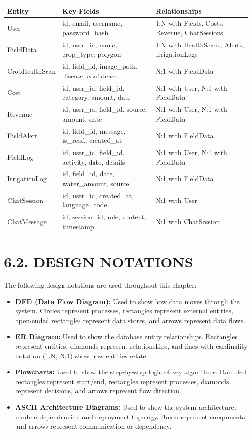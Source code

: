 \documentclass[12pt, a4paper]{report}
\begin{document}
\begin{table}[htbp]
\centering
\small
\begin{tabularx}{\textwidth}{|X|X|X|}
\hline
Entity & Key Fields & Relationships \\
\hline
User & id, email, username, password\_hash & 1:N with Fields, Costs, Revenue, ChatSessions \\
FieldData & id, user\_id, name, crop\_type, polygon & 1:N with HealthScans, Alerts, IrrigationLogs \\
CropHealthScan & id, field\_id, image\_path, disease, confidence & N:1 with FieldData \\
Cost & id, user\_id, field\_id, category, amount, date & N:1 with User, N:1 with FieldData \\
Revenue & id, user\_id, field\_id, source, amount, date & N:1 with User, N:1 with FieldData \\
FieldAlert & id, field\_id, message, is\_read, created\_at & N:1 with FieldData \\
FieldLog & id, user\_id, field\_id, activity, date, details & N:1 with User, N:1 with FieldData \\
IrrigationLog & id, field\_id, date, water\_amount, source & N:1 with FieldData \\
ChatSession & id, user\_id, created\_at, language\_code & N:1 with User \\
ChatMessage & id, session\_id, role, content, timestamp & N:1 with ChatSession \\
\hline
\end{tabularx}
\end{table}

\section{6.2. DESIGN NOTATIONS}
The following design notations are used throughout this chapter:

\begin{itemize}[leftmargin=*]
  \item \textbf{DFD (Data Flow Diagram):} Used to show how data moves through the system. Circles represent processes, rectangles represent external entities, open-ended rectangles represent data stores, and arrows represent data flows.
  \item \textbf{ER Diagram:} Used to show the database entity relationships. Rectangles represent entities, diamonds represent relationships, and lines with cardinality notation (1:N, N:1) show how entities relate.
  \item \textbf{Flowcharts:} Used to show the step-by-step logic of key algorithms. Rounded rectangles represent start/end, rectangles represent processes, diamonds represent decisions, and arrows represent flow direction.
  \item \textbf{ASCII Architecture Diagrams:} Used to show the system architecture, module dependencies, and deployment topology. Boxes represent components and arrows represent communication or dependency.
\end{itemize}
\end{document}
